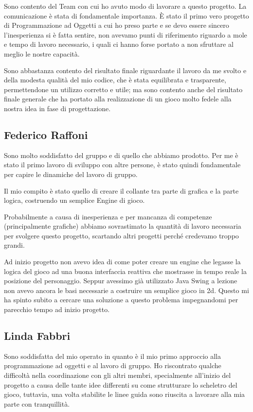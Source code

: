 \documentclass[a4paper,12pt]{report}
\begin{document}
Sono contento del Team con cui ho avuto modo di lavorare a questo progetto. La comunicazione è stata di fondamentale importanza.
È stato il primo vero progetto di Programmazione ad Oggetti a cui ho preso parte e se devo essere sincero l'inesperienza si è fatta sentire, non avevamo punti di riferimento riguardo a mole e tempo di lavoro necessario, i quali ci hanno forse portato a non sfruttare al meglio le nostre capacità.

Sono abbastanza contento del risultato finale riguardante il lavoro da me svolto e della modesta qualità del mio codice, che è stata equilibrata e trasparente, permettendone un utilizzo corretto e utile; ma sono contento anche del risultato finale generale che ha portato alla realizzazione di un gioco molto fedele alla nostra idea in fase di progettazione.

\subsection{Federico Raffoni}
Sono molto soddisfatto del gruppo e di quello che abbiamo prodotto. Per me è stato il primo lavoro di sviluppo con altre persone, è stato quindi fondamentale per capire le dinamiche del lavoro di gruppo. 

Il mio compito è stato quello di creare il collante tra parte di grafica e la parte logica, costruendo un semplice Engine di gioco.

Probabilmente a causa di inesperienza e per mancanza di competenze (principalmente grafiche) abbiamo sovrastimato la quantità di lavoro necessaria per svolgere questo progetto, scartando altri progetti perché credevamo troppo grandi.

Ad inizio progetto non avevo idea di come poter creare un engine che legasse la logica del gioco ad una buona interfaccia reattiva che mostrasse in tempo reale la posizione del personaggio. Seppur avessimo già utilizzato Java Swing a lezione non avevo ancora le basi necessarie a costruire un semplice gioco in 2d. Questo mi ha spinto subito a cercare una soluzione a questo problema impegnandomi per parecchio tempo ad inizio progetto.
\subsection{Linda Fabbri}
Sono soddisfatta del mio operato in quanto è il mio primo approccio alla programmazione ad oggetti e al lavoro di gruppo. Ho riscontrato qualche difficoltà nella coordinazione con gli altri membri, specialmente all’inizio del progetto a causa delle tante idee differenti su come strutturare lo scheletro del gioco, tuttavia, una volta stabilite le linee guida sono riuscita a lavorare alla mia parte con tranquillità. 
\end{document}
